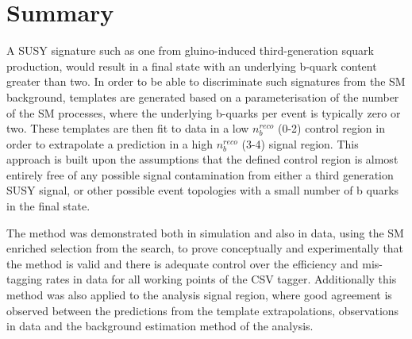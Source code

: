 \section{Summary}
\label{subsec:templateconclusions}

A \ac{SUSY} signature such as one from gluino-induced third-generation squark production, would result in a final state with an underlying b-quark content greater than two. In order to be able to discriminate such signatures from the \ac{SM} background, templates are generated based on a parameterisation of the number of the \ac{SM} processes, where the underlying b-quarks per event is typically zero or two. These templates are then fit to data in a low $n_{b}^{reco}$ (0-2) control region in order to extrapolate a prediction in a high $n_{b}^{reco}$ (3-4) signal region. This approach is built upon the assumptions that the defined control region is almost entirely free of any possible signal contamination from either a third generation \ac{SUSY} signal, or other possible event topologies with a small number of b quarks in the final state.

The method was demonstrated both in simulation and also in data, using the \ac{SM} enriched \mupjets selection from the \alphat search, to prove conceptually and experimentally that the method is valid and there is adequate control over the efficiency and mis-tagging rates in data for all working points of the \ac{CSV} tagger. Additionally this method was also applied to the \alphat analysis signal region, where good agreement is observed between the predictions from the template extrapolations, observations in data and the background estimation method of the \alphat analysis.

